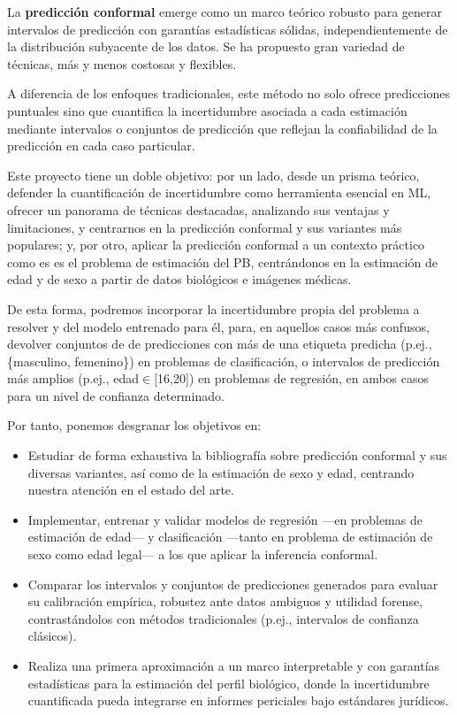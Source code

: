 La \textbf{predicción conformal} emerge como un marco teórico robusto para 
generar intervalos de predicción con garantías estadísticas sólidas, independientemente de la distribución 
subyacente de los datos. Se ha propuesto gran variedad de técnicas, más y menos costosas y flexibles.

A diferencia de los enfoques tradicionales, este método no solo ofrece predicciones puntuales sino que 
cuantifica la incertidumbre asociada a cada estimación mediante intervalos o conjuntos de 
predicción que reflejan la confiabilidad de la predicción en cada caso particular.

Este proyecto tiene un doble objetivo: por un lado, desde un prisma teórico, defender la cuantificación de
incertidumbre como herramienta esencial en ML, ofrecer un panorama de técnicas destacadas, analizando sus
ventajas y limitaciones, y centrarnos en la predicción conformal y sus variantes más populares; y, 
por otro, aplicar la predicción conformal a un contexto práctico como es es el problema de estimación del PB, 
centrándonos en la estimación de edad y de sexo a partir de datos biológicos e imágenes médicas. 

De esta forma, podremos incorporar la incertidumbre propia del problema a resolver y del modelo entrenado para 
él, para, en aquellos casos más confusos, devolver conjuntos de de predicciones con más de una etiqueta 
predicha (p.ej., \{masculino, femenino\}) en problemas de clasificación, o intervalos de predicción más 
amplios (p.ej., edad$\in$[16,20]) en problemas de regresión, en ambos casos para un nivel de confianza 
determinado.

Por tanto, ponemos desgranar los objetivos en:

\begin{itemize}

    \item Estudiar de forma exhaustiva la bibliografía sobre predicción conformal y sus diversas 
    variantes, así como de la estimación de sexo y edad, centrando nuestra atención en el estado del arte.

    \item Implementar, entrenar y validar modelos de regresión ---en problemas de estimación de edad--- y 
    clasificación ---tanto en problema de estimación de sexo como edad legal--- a los que aplicar la 
    inferencia conformal.

    \item Comparar los intervalos y conjuntos de predicciones generados para evaluar su calibración empírica, 
    robustez ante datos ambiguos y utilidad forense, contrastándolos con métodos tradicionales (p.ej., 
    intervalos de confianza clásicos).  

    \item Realiza una primera aproximación a un marco interpretable y con garantías estadísticas para la 
    estimación del perfil biológico, donde la incertidumbre cuantificada pueda integrarse en informes 
    periciales bajo estándares jurídicos.

\end{itemize}

